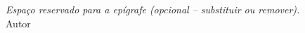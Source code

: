 %

\chapter*{}
\vspace{15cm}
\begin{flushright}
	\textit { Espaço reservado para a epígrafe (opcional -- substituir ou remover). }\medskip\\
	Autor
\end{flushright}
